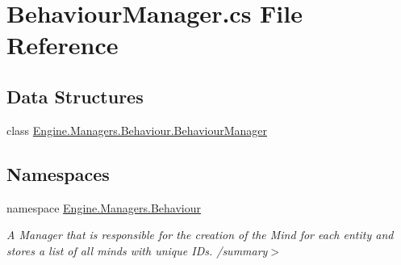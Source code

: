 \hypertarget{a00146}{}\section{Behaviour\+Manager.\+cs File Reference}
\label{a00146}
\subsection*{Data Structures}
\begin{DoxyCompactItemize}
\item 
class \hyperlink{a00486}{Engine.\+Managers.\+Behaviour.\+Behaviour\+Manager}
\end{DoxyCompactItemize}
\subsection*{Namespaces}
\begin{DoxyCompactItemize}
\item 
namespace \hyperlink{a00266}{Engine.\+Managers.\+Behaviour}
\begin{DoxyCompactList}\small\item\em A Manager that is responsible for the creation of the Mind for each entity and stores a list of all minds with unique I\+Ds. /summary$>$ \end{DoxyCompactList}\end{DoxyCompactItemize}

